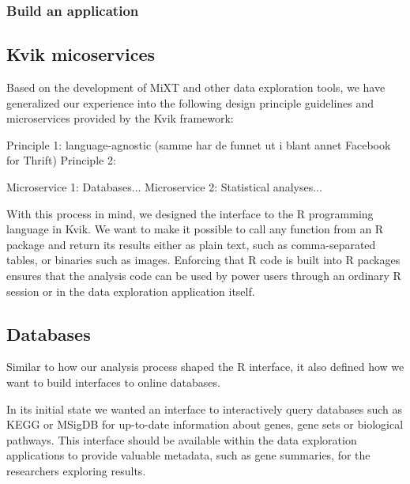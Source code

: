 \subsubsection*{Build an application} 

\subsection{Kvik micoservices}

Based on the development of MiXT and other data exploration tools, we have
generalized our experience into the following design principle guidelines and
microservices provided by the Kvik framework:

Principle 1: language-agnostic (samme har de funnet ut i blant annet Facebook for Thrift)
Principle 2:

Microservice 1: Databases...
Microservice 2: Statistical analyses...


With this process in mind, we designed the interface to the R programming
language in Kvik. We want to make it possible to call any function from an R
package and return its results either as plain text, such as comma-separated
tables, or binaries such as images. Enforcing that R code is built into R
packages ensures that the analysis code can be used by power users through an
ordinary R session or in the data exploration application itself. 

\subsection*{Databases} 

Similar to how our analysis process shaped the R interface, it also defined how
we want to build interfaces to online databases. 


In its initial state we wanted an interface to interactively query databases
such as KEGG or MSigDB for up-to-date information about genes, gene sets or
biological pathways. This interface should be available within the data
exploration applications to provide valuable metadata, such as gene summaries,
for the researchers exploring results.  

